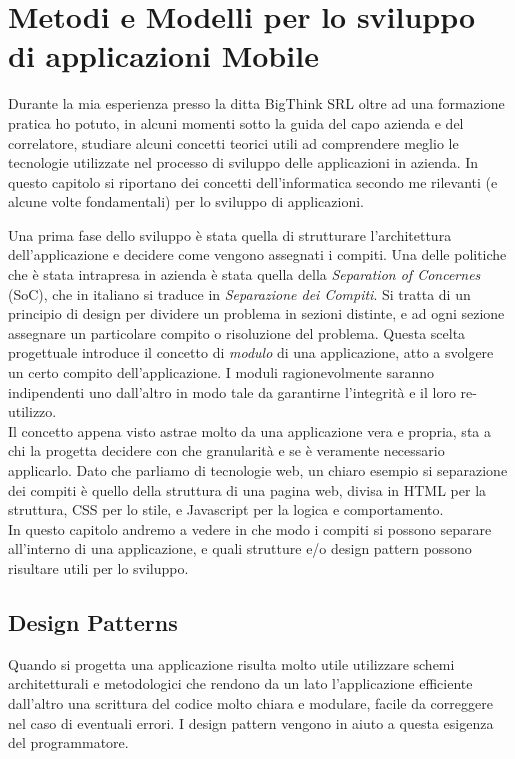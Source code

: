\chapter{Metodi e Modelli per lo sviluppo di applicazioni Mobile}
Durante la mia esperienza presso la ditta BigThink SRL oltre ad una formazione pratica ho potuto, in alcuni momenti sotto la guida del capo azienda e del correlatore, studiare alcuni concetti teorici utili ad comprendere meglio le tecnologie utilizzate nel processo di sviluppo delle applicazioni in azienda. In questo capitolo si riportano dei concetti dell'informatica secondo me rilevanti (e alcune volte fondamentali) per lo sviluppo di applicazioni.

Una prima fase dello sviluppo è stata quella di strutturare l'architettura dell'applicazione e decidere come vengono assegnati i compiti. Una delle politiche che è stata intrapresa in azienda è stata quella della \emph{Separation of Concernes} (SoC), che in italiano si traduce in \emph{Separazione dei Compiti}. Si tratta di un principio di design per dividere un problema in sezioni distinte, e ad ogni sezione assegnare un particolare compito o risoluzione del problema. Questa scelta progettuale introduce il concetto di \emph{modulo} di una applicazione, atto a svolgere un certo compito dell'applicazione. I moduli ragionevolmente saranno indipendenti uno dall'altro in modo tale da garantirne l'integrità e il loro re-utilizzo.\cite{wiki:soc}\\

Il concetto appena visto astrae molto da una applicazione vera e propria, sta a chi la progetta decidere con che granularità  e se è veramente necessario applicarlo. Dato che parliamo di tecnologie web, un chiaro esempio si separazione dei compiti è quello della struttura di una pagina web, divisa in HTML per la struttura, CSS per lo stile, e Javascript per la logica e comportamento.\\

In questo capitolo andremo a vedere in che modo i compiti si possono separare all'interno di una applicazione, e quali strutture e/o design pattern possono risultare utili per lo sviluppo.
 
\section{Design Patterns}

Quando si progetta una applicazione risulta molto utile utilizzare schemi architetturali e metodologici che rendono da un lato l'applicazione efficiente dall'altro una scrittura del codice molto chiara e modulare, facile da correggere nel caso di eventuali errori. I design pattern vengono in aiuto a questa esigenza del programmatore.

